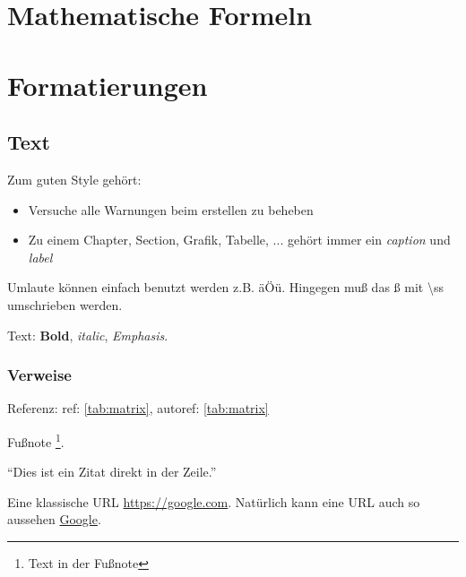 
\blinddocument

\chapter{Mathematische Formeln}\label{cha:mathematischeFormeln}

\blindmathpaper

\chapter{Formatierungen}\label{cha:formatierungen}

\blindtext

\section{Text}\label{sec:text}

Zum guten Style gehört:
\begin{itemize}
	\item Versuche alle Warnungen beim erstellen zu beheben
	\item Zu einem Chapter, Section, Grafik, Tabelle, ... gehört immer ein \textit{caption} und \textit{label}
\end{itemize}

Umlaute können einfach benutzt werden z.B. äÖü. Hingegen mu{\ss} das {\ss} mit \textbackslash ss umschrieben werden.\par

Text: \textbf{Bold}, \textit{italic}, \emph{Emphasis}.\par

\subsection{Verweise}\label{ssec:verweise}

Referenz: ref: \ref{tab:matrix}, autoref: \autoref{tab:matrix}\par

Fußnote \footnote{Text in der Fußnote}.\par

\enquote{Dies ist ein Zitat direkt in der Zeile.}\par

Eine klassische URL \url{https://google.com}. %
Natürlich kann eine URL auch so aussehen \href{https://google.com}{Google}.\par

